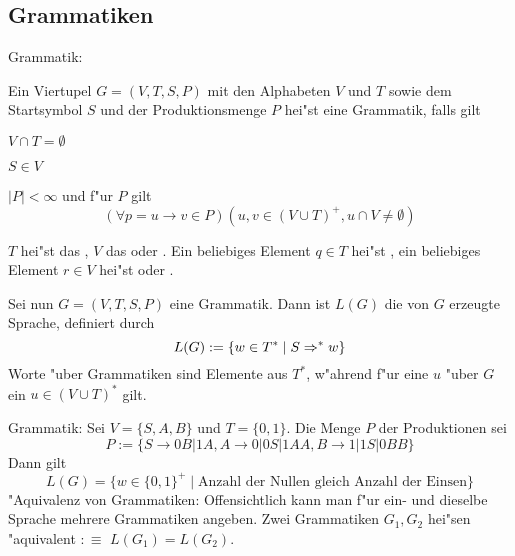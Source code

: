 \subsection{Grammatiken}
 Grammatik:{
  Ein Viertupel $G=(V,T,S,P)$ mit den Alphabeten $V$ und $T$ sowie dem
  Startsymbol $S$ und der Produktionsmenge $P$ hei"st eine Grammatik,
  falls gilt
  \begin{stmts}
  \item $V\cap T=\emptyset$
  \item $S\in V$
  \item $|P|<\infty$ und f"ur $P$ gilt
    \[(\forall p=u\to v \in P)(u,v\in(V\cup T)^+, u\cap V\ne\emptyset) 
      \]
  \end{stmts}
  $T$ hei"st das , $V$ das
   oder . Ein
  beliebiges Element $q \in T$ hei"st , ein
  beliebiges Element $r \in V$ hei"st  oder 
  .

  Sei nun $G=(V,T,S,P)$ eine Grammatik. Dann ist $L(G)$ die von $G$
  erzeugte Sprache, definiert durch 
  \[L(G):=\{w\in T^*\mid  S \Rightarrow^* w\}
    \]
  Worte  "uber Grammatiken sind Elemente aus $T^*$, w"ahrend
  f"ur eine  $u$ "uber $G$ ein $u\in(V\cup T)^*$ gilt.
  }
\example Grammatik:{
  Sei $V=\{S,A,B\}$ und $T=\{0,1\}$. Die Menge $P$ der Produktionen sei
  \[P:=\{S \to 0B | 1A,A\to 0 | 0S | 1AA,B \to 1 | 1S | 0BB\}
    \]
  Dann gilt
  \[L(G)=\{w \in \{0, 1\}^+\mid\text{Anzahl der Nullen gleich
    Anzahl der Einsen}\}
    \]
  }
 "Aquivalenz von Grammatiken:{
  Offensichtlich kann man f"ur ein- und dieselbe Sprache mehrere Grammatiken
  angeben. Zwei Grammatiken $G_1,G_2$ hei"sen "aquivalent 
  $:\equiv$ $L(G_1)=L(G_2)$.
  }
